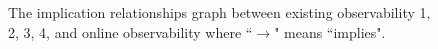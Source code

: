 \begin{figure}[thpb]
      \centering
      
      \caption{The implication relationships graph between existing observability 1, 2, 3, 4, and online observability where ``$\rightarrow$" means ``implies".}
      \label{fig:7}
   \end{figure}


   
